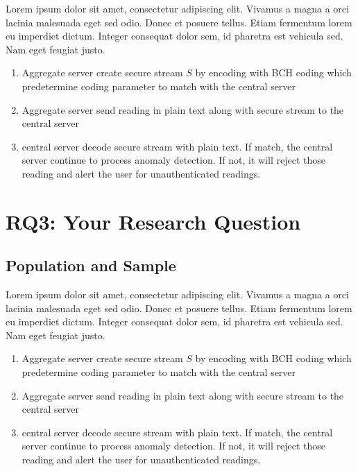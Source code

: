 Lorem ipsum dolor sit amet, consectetur adipiscing elit. Vivamus a magna a orci lacinia malesuada eget sed odio. Donec et posuere tellus. Etiam fermentum lorem eu imperdiet dictum. Integer consequat dolor sem, id pharetra est vehicula sed. Nam eget feugiat justo.
\begin{enumerate}
	\item Aggregate server create secure stream $S$ by encoding with BCH coding which predetermine coding parameter to match with the central server
	\item Aggregate server send reading in plain text along with secure stream to the central server
	\item central server decode secure stream with plain text. If match, the central server continue to process anomaly detection. If not, it will reject those reading and alert the user for unauthenticated readings.
\end{enumerate}

\section{RQ3: Your Research Question}

\subsection{Population and Sample}
\lipsum[1]

Lorem ipsum dolor sit amet, consectetur adipiscing elit. Vivamus a magna a orci lacinia malesuada eget sed odio. Donec et posuere tellus. Etiam fermentum lorem eu imperdiet dictum. Integer consequat dolor sem, id pharetra est vehicula sed. Nam eget feugiat justo.
\begin{enumerate}
	\item Aggregate server create secure stream $S$ by encoding with BCH coding which predetermine coding parameter to match with the central server
	\item Aggregate server send reading in plain text along with secure stream to the central server
	\item central server decode secure stream with plain text. If match, the central server continue to process anomaly detection. If not, it will reject those reading and alert the user for unauthenticated readings.
\end{enumerate}